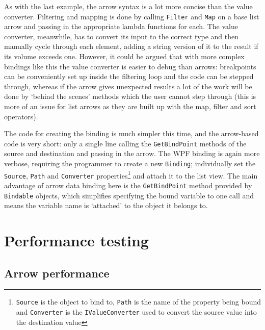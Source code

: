 \documentclass[12pt,twoside,notitlepage]{report}
\begin{document}
As with the last example, the arrow syntax is a lot more concise than the value converter. Filtering and mapping is done by calling \texttt{Filter} and \texttt{Map} on a base list arrow and passing in the appropriate lambda functions for each. The value converter, meanwhile, has to convert its input to the correct type and then manually cycle through each element, adding a string version of it to the result if its volume exceeds one. However, it could be argued that with more complex bindings like this the value converter is easier to debug than arrows: breakpoints can be conveniently set up inside the filtering loop and the code can be stepped through, whereas if the arrow gives unexpected results a lot of the work will be done by `behind the scenes' methods which the user cannot step through (this is more of an issue for list arrows as they are built up with the map, filter and sort operators).

The code for creating the binding is much simpler this time, and the arrow-based code is very short: only a single line calling the \texttt{GetBindPoint} methods of the source and destination and passing in the arrow. The WPF binding is again more verbose, requiring the programmer to create a new \texttt{Binding}; individually set the \texttt{Source}, \texttt{Path} and \texttt{Converter} properties\footnote{\texttt{Source} is the object to bind to, \texttt{Path} is the name of the property being bound and \texttt{Converter} is the \texttt{IValueConverter} used to convert the source value into the destination value} and attach it to the list view. The main advantage of arrow data binding here is the \texttt{GetBindPoint} method provided by \texttt{Bindable} objects, which simplifies specifying the bound variable to one call and means the variable name is `attached' to the object it belongs to.


\section{Performance testing}

\subsection{Arrow performance}
\end{document}

